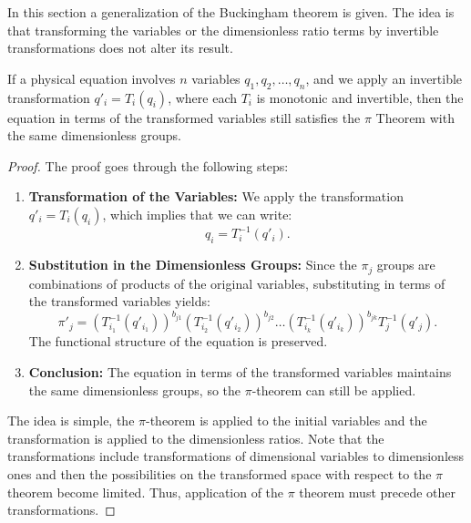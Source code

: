 \documentclass[
	11pt, %
	fleqn, %
	a4paper, %
]{LegrandOrangeBook}
\begin{document}
In this section a generalization of the Buckingham theorem is given. The idea is that transforming the variables or the dimensionless ratio terms by invertible transformations does not alter its result.

\begin{theorem}
\label{thm:generalization}
If a physical equation involves $n$ variables $q_1,q_2,\ldots,q_n$, and we apply an invertible transformation $q'_i = T_i(q_i)$, where each $T_i$ is monotonic and invertible, then the equation in terms of the transformed variables still satisfies the $\pi$ Theorem with the same dimensionless groups.
\end{theorem}

\begin{proof}
The proof goes through the following steps:
\begin{enumerate}
\item \textbf{Transformation of the Variables:} We apply the transformation $q'_i = T_i(q_i)$, which implies that we can write:
\begin{equation}
q_i = T_i^{-1}(q'_i).
\label{eq:inversetransform}
\end{equation}

\item \textbf{Substitution in the Dimensionless Groups:} Since the $\pi_j$ groups are combinations of products of the original variables, substituting in terms of the transformed variables yields:
\begin{equation}
\pi'_j = (T_{i_1}^{-1}(q'_{i_1}))^{b_{j1}} (T_{i_2}^{-1}(q'_{i_2}))^{b_{j2}}\ldots(T_{i_k}^{-1}(q'_{i_k}))^{b_{jk}}T_j^{-1}(q'_j).
\label{eq:transformedpi}
\end{equation}
The functional structure of the equation is preserved.

\item \textbf{Conclusion:} The equation in terms of the transformed variables maintains the same dimensionless groups, so the $\pi$-theorem can still be applied.
\end{enumerate}

The idea is simple, the $\pi$-theorem is applied to the initial variables and the transformation is applied to the dimensionless ratios. Note that the transformations include transformations of dimensional variables to dimensionless ones and then the possibilities on the transformed space with respect to the $\pi$ theorem become limited. Thus, application of the $\pi$ theorem must precede other transformations.
\end{proof}
\end{document}
